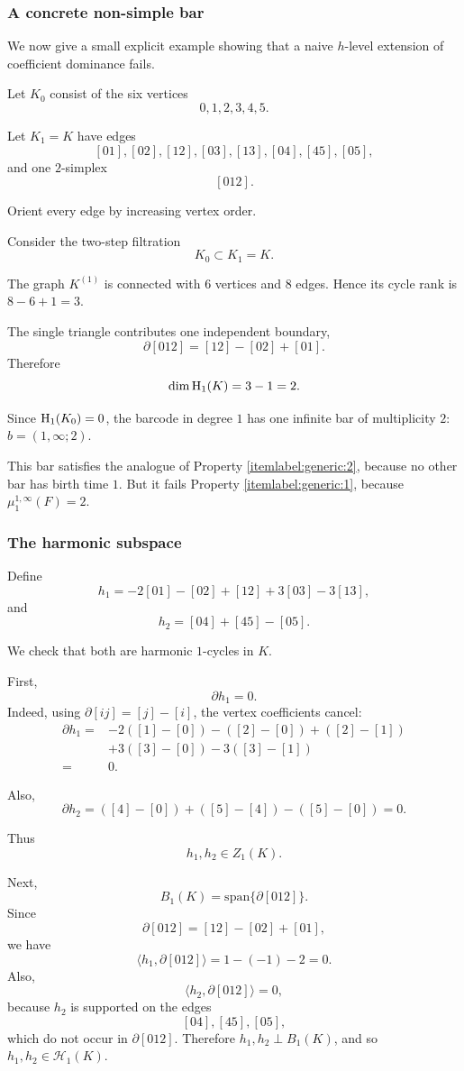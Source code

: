 \documentclass[11pt]{amsart}
\theoremstyle{theorem}
\theoremstyle{remark}
\theoremstyle{definition}
\newcommand{\HH}  {\mbox{\rm H}}
\begin{document}
\subsubsection{A concrete non-simple bar}

We now give a small explicit example showing that a naive \(h\)-level extension
of coefficient dominance fails.

Let \(K_0\) consist of the six vertices
\[
0,1,2,3,4,5.
\]

Let \(K_1=K\) have edges
\[
[01],[02],[12],[03],[13],[04],[45],[05],
\]
and one \(2\)-simplex
\[
[012].
\]

Orient every edge by increasing vertex order.

Consider the two-step filtration
\[
K_0\subset K_1=K.
\]

The graph \(K^{(1)}\) is connected with
$6$
vertices and $8$
edges. Hence its cycle rank is
$
8-6+1=3.
$

The single triangle contributes one independent boundary,
\[
\partial[012]=[12]-[02]+[01].
\]
Therefore
\[
\dim \HH_1(K)=3-1=2.
\]

Since
$
\HH_1(K_0)=0
$,
the barcode in degree \(1\) has one infinite bar of multiplicity \(2\):
$
b=(1,\infty;2).
$

This bar satisfies the analogue of Property \eqref{itemlabel:generic:2}, because no other bar has birth
time \(1\). But it fails Property \eqref{itemlabel:generic:1}, because
$
\mu_1^{1,\infty}(F)=2.
$

\subsubsection{The harmonic subspace}

Define
\[
h_1=-2[01]-[02]+[12]+3[03]-3[13],
\]
and
\[
h_2=[04]+[45]-[05].
\]

We check that both are harmonic \(1\)-cycles in \(K\).

First,
\[
\partial h_1=0.
\]
Indeed, using \(\partial[ij]=[j]-[i]\), the vertex coefficients cancel:
\[
\begin{aligned}
\partial h_1
={}&-2([1]-[0])-([2]-[0])+([2]-[1])\\
&+3([3]-[0])-3([3]-[1])\\
={}&0.
\end{aligned}
\]

Also,
\[
\partial h_2
=
([4]-[0])+([5]-[4])-([5]-[0])
=
0.
\]

Thus
\[
h_1,h_2\in Z_1(K).
\]

Next,
\[
B_1(K)=\mathrm{span}\{\partial[012]\}.
\]
Since
\[
\partial[012]=[12]-[02]+[01],
\]
we have
\[
\langle h_1,\partial[012]\rangle
=
1-(-1)-2
=
0.
\]
Also,
\[
\langle h_2,\partial[012]\rangle=0,
\]
because \(h_2\) is supported on the edges
\[
[04],[45],[05],
\]
which do not occur in \(\partial[012]\).
Therefore
$
h_1,h_2\perp B_1(K)
$,
and so
$
h_1,h_2\in \mathcal{H}_1(K)
$.
\end{document}
